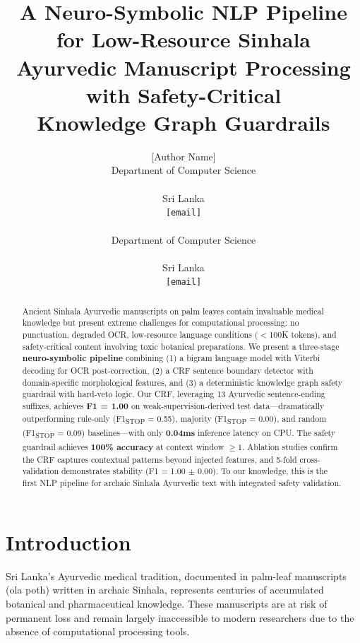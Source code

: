 \documentclass[11pt,a4paper]{article}
\title{A Neuro-Symbolic NLP Pipeline for Low-Resource Sinhala\\Ayurvedic Manuscript Processing with Safety-Critical\\Knowledge Graph Guardrails}
\author{
  [Author Name] \\
  Department of Computer Science \\
  [University Name] \\
  Sri Lanka \\
  \texttt{[email]} \\
\And
  [Supervisor Name] \\
  Department of Computer Science \\
  [University Name] \\
  Sri Lanka \\
  \texttt{[email]}
}
\begin{document}
\maketitle

\begin{abstract}
Ancient Sinhala Ayurvedic manuscripts on palm leaves contain invaluable medical knowledge but present extreme challenges for computational processing: no punctuation, degraded OCR, low-resource language conditions ($<$100K tokens), and safety-critical content involving toxic botanical preparations. We present a three-stage \textbf{neuro-symbolic pipeline} combining (1) a bigram language model with Viterbi decoding for OCR post-correction, (2) a CRF sentence boundary detector with domain-specific morphological features, and (3) a deterministic knowledge graph safety guardrail with hard-veto logic. Our CRF, leveraging 13 Ayurvedic sentence-ending suffixes, achieves \textbf{F1 = 1.00} on weak-supervision-derived test data—dramatically outperforming rule-only (F1\textsubscript{STOP} = 0.55), majority (F1\textsubscript{STOP} = 0.00), and random (F1\textsubscript{STOP} = 0.09) baselines—with only \textbf{0.04ms} inference latency on CPU. The safety guardrail achieves \textbf{100\% accuracy} at context window $\geq 1$. Ablation studies confirm the CRF captures contextual patterns beyond injected features, and 5-fold cross-validation demonstrates stability (F1 = 1.00 $\pm$ 0.00). To our knowledge, this is the first NLP pipeline for archaic Sinhala Ayurvedic text with integrated safety validation.
\end{abstract}

\section{Introduction}

Sri Lanka's Ayurvedic medical tradition, documented in palm-leaf manuscripts (ola poth) written in archaic Sinhala, represents centuries of accumulated botanical and pharmaceutical knowledge. These manuscripts are at risk of permanent loss and remain largely inaccessible to modern researchers due to the absence of computational processing tools.
\end{document}
